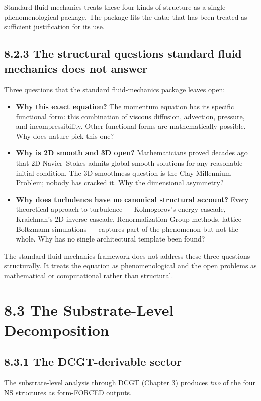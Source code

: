 \documentclass[11pt]{book}
\begin{document}
Standard fluid mechanics treats these four kinds of structure as a single phenomenological package. The package fits the data; that has been treated as sufficient justification for its use.

\subsection{8.2.3 The structural questions standard fluid mechanics does not answer}

Three questions that the standard fluid-mechanics package leaves open:

\begin{itemize}
\item \textbf{Why this exact equation?} The momentum equation has its specific functional form: this combination of viscous diffusion, advection, pressure, and incompressibility. Other functional forms are mathematically possible. Why does nature pick this one?
\item \textbf{Why is 2D smooth and 3D open?} Mathematicians proved decades ago that 2D Navier–Stokes admits global smooth solutions for any reasonable initial condition. The 3D smoothness question is the Clay Millennium Problem; nobody has cracked it. Why the dimensional asymmetry?
\item \textbf{Why does turbulence have no canonical structural account?} Every theoretical approach to turbulence — Kolmogorov's energy cascade, Kraichnan's 2D inverse cascade, Renormalization Group methods, lattice-Boltzmann simulations — captures part of the phenomenon but not the whole. Why has no single architectural template been found?
\end{itemize}

The standard fluid-mechanics framework does not address these three questions structurally. It treats the equation as phenomenological and the open problems as mathematical or computational rather than structural.

\section{8.3 The Substrate-Level Decomposition}

\subsection{8.3.1 The DCGT-derivable sector}

The substrate-level analysis through DCGT (Chapter 3) produces \textit{two} of the four NS structures as form-FORCED outputs.
\end{document}
